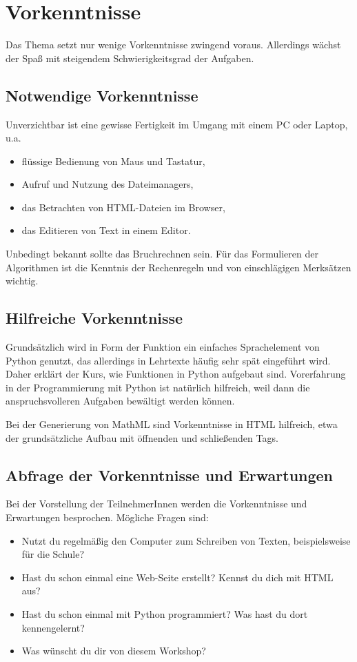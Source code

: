 \section{Vorkenntnisse}

Das Thema setzt nur wenige Vorkenntnisse zwingend voraus. Allerdings wächst der Spaß mit steigendem Schwierigkeitsgrad der Aufgaben.

\subsection*{Notwendige Vorkenntnisse}

Unverzichtbar ist eine gewisse Fertigkeit im Umgang mit einem PC oder Laptop, u.a.
\begin{itemize}
	\item flüssige Bedienung von Maus und Tastatur,
	\item Aufruf und Nutzung des Dateimanagers,
	\item das Betrachten von HTML-Dateien im Browser,
	\item das Editieren von Text in einem Editor.
\end{itemize}

Unbedingt bekannt sollte das Bruchrechnen sein. Für das Formulieren der Algorithmen ist die Kenntnis der Rechenregeln und von einschlägigen Merksätzen wichtig.

\subsection*{Hilfreiche Vorkenntnisse}

Grundsätzlich wird in Form der Funktion ein einfaches Sprachelement von Python genutzt, das allerdings in Lehrtexte häufig sehr spät eingeführt wird. Daher erklärt der Kurs, wie Funktionen in Python aufgebaut sind. Vorerfahrung in der Programmierung mit Python ist natürlich hilfreich, weil dann die anspruchsvolleren Aufgaben bewältigt werden können.

Bei der Generierung von MathML sind Vorkenntnisse in HTML hilfreich, etwa der grundsätzliche Aufbau mit öffnenden und schließenden Tags.

\subsection*{Abfrage der Vorkenntnisse und Erwartungen}

Bei der Vorstellung der TeilnehmerInnen werden die Vorkenntnisse und Erwartungen besprochen. Mögliche Fragen sind:

\begin{itemize}
	\item Nutzt du regelmäßig den Computer zum Schreiben von Texten, beispielsweise für die Schule?
	\item Hast du schon einmal eine Web-Seite erstellt? Kennst du dich mit HTML aus?
	\item Hast du schon einmal mit Python programmiert? Was hast du dort kennengelernt?
	\item Was wünscht du dir von diesem Workshop?
\end{itemize}